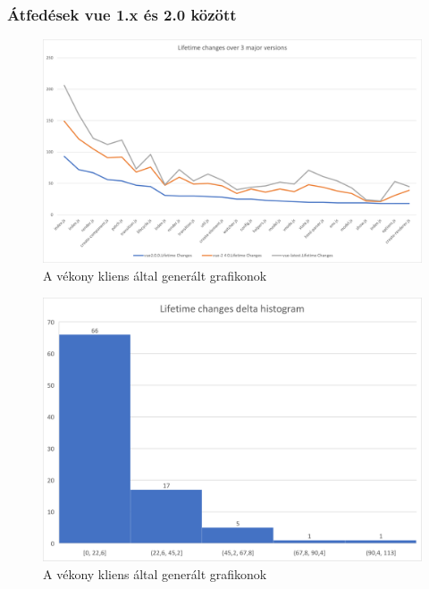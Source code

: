 \subsubsection{Átfedések vue 1.x és 2.0 között}

\begin{figure}[H]
    \centering
    \includegraphics[width=1\textwidth]{images/vue/vue-all-lifetime-changes.png}
    \caption{A vékony kliens által generált grafikonok}
    \label{fig:hestia-charts}
\end{figure}

\begin{figure}[H]
    \centering
    \includegraphics[width=1\textwidth]{images/vue/vue-all-lifetime-changes-delta-hist.png}
    \caption{A vékony kliens által generált grafikonok}
    \label{fig:hestia-charts}
\end{figure}

